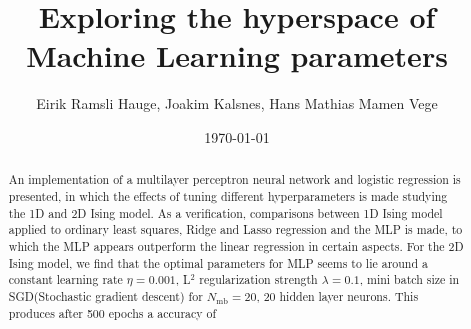 \documentclass[11pt]{article}
\title{Exploring the hyperspace of Machine Learning parameters}
\author{Eirik Ramsli Hauge, Joakim Kalsnes, Hans Mathias Mamen Vege}
\date{\today}
\begin{document}
\maketitle

\begin{abstract}
An implementation of a multilayer perceptron neural network and logistic regression is presented, in which the effects of tuning different hyperparameters is made studying the 1D and 2D Ising model. As a verification, comparisons between 1D Ising model applied to ordinary least squares, Ridge and Lasso regression and the MLP is made, to which the MLP appears outperform the linear regression in certain aspects. For the 2D Ising model, we find that the optimal parameters for MLP seems to lie around a constant learning rate $\eta=0.001$, L$^2$ regularization strength $\lambda=0.1$, mini batch size in SGD(Stochastic gradient descent) for $N_\mathrm{mb}=20$, 20 hidden layer neurons. This produces after 500 epochs a accuracy of 
\end{abstract}














% 



\end{document}
